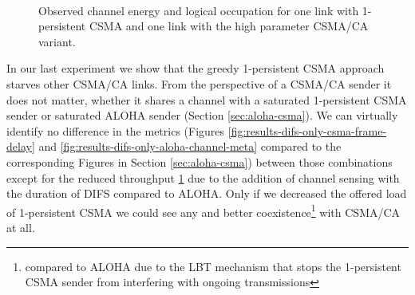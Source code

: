 \begin{figure}[tb]
	\label{fig:results-difs-only-csma-channel-meta}
	\begin{center}
		\\
	\end{center}
	\caption{Observed channel energy and logical occupation for one link with 1-persistent CSMA and one link with the high parameter CSMA/CA variant.}
\end{figure}

In our last experiment we show that the greedy 1-persistent CSMA approach starves other CSMA/CA links. From the perspective of a CSMA/CA sender it does not matter, whether it shares a channel with a saturated 1-persistent CSMA sender or saturated ALOHA sender (Section \ref{sec:aloha-csma}). We can virtually identify no difference in the metrics (Figures \ref{fig:results-difs-only-csma-frame-delay} and \ref{fig:results-difs-only-aloha-channel-meta} compared to the corresponding Figures in Section \ref{sec:aloha-csma}) between those combinations except for the reduced throughput \ref{fig:results-difs-only-csma-channel-meta} due to the addition of channel sensing with the duration of DIFS compared to ALOHA. Only if we decreased the offered load of 1-persistent CSMA we could see any and better coexistence\footnote{compared to ALOHA due to the LBT mechanism that stops the 1-persistent CSMA sender from interfering with ongoing transmissions} with CSMA/CA at all.

